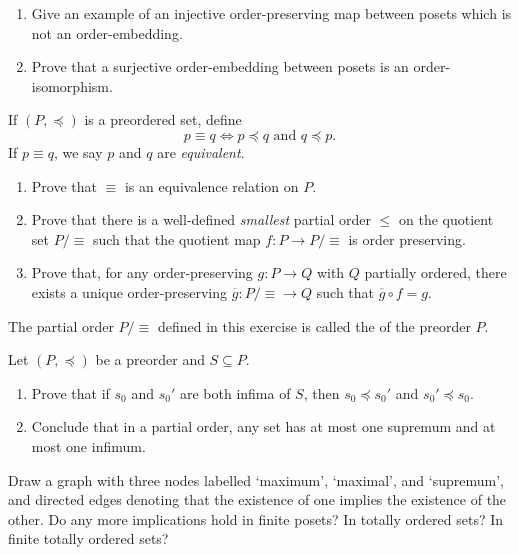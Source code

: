\begin{exercise}\label{exe:orderemb}
\begin{enumerate}
\item Give an example of an injective order-preserving map between posets which is not an order-embedding.\label{exe:injnotemb}
\item Prove that a surjective order-embedding between posets is an order-isomorphism.\label{exe:surjembisiso}
\end{enumerate}
\end{exercise}



\begin{exercise}\label{exe:reflection}
If $(P,\preceq)$ is a preordered set, define
\[ p \equiv q \iff p \preceq q \text{ and } q \preceq p.\]
If $p \equiv q$, we say $p$ and $q$ are \emph{equivalent}.
\begin{enumerate}
\item Prove that $\equiv$ is an equivalence relation on $P$.
\item Prove that there is a well-defined \emph{smallest} partial order $\leq$ on the quotient set $P/{\equiv}$ such that the quotient map $f \colon P \to P/{\equiv}$ is order preserving.
\item Prove that, for any order-preserving $g \colon P \to Q$ with $Q$ partially ordered, there exists a unique order-preserving $\overline{g} \colon P/{\equiv} \to Q$ such that $\overline{g} \circ f = g$.
\end{enumerate}
The partial order $P/{\equiv}$ defined in this exercise is called the  of the preorder $P$.
\end{exercise}




\begin{exercise}\label{exe:infsupunique}
Let $(P,\preceq)$ be a preorder and $S \subseteq P$.
\begin{enumerate}
\item Prove that if $s_0$ and $s_0'$ are both infima of $S$, then $s_0 \preceq s_0'$ and $s_0' \preceq s_0$.
\item Conclude that in a partial order, any set has at most one supremum and at most one infimum.
\end{enumerate}
\end{exercise}
\begin{exercise}\label{exe:umalsup}
Draw a graph with three nodes labelled `maximum', `maximal', and `supremum', and directed edges denoting that the existence of one implies the existence of the other. Do any more implications hold in finite posets? In totally ordered sets? In finite totally ordered sets?
\end{exercise}

